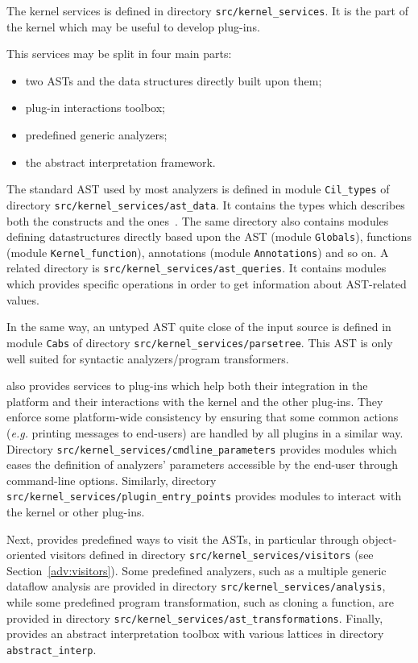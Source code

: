 The kernel services is defined in directory \texttt{src/kernel\_services}. It
is the part of the \framac kernel which may be useful to develop plug-ins.

This services may be split in four main parts:
\begin{itemize}
\item two ASTs and the data structures directly built upon them;
\item plug-in interactions toolbox;
\item predefined generic analyzers;
\item the abstract interpretation framework.
\end{itemize}

The standard AST used by most analyzers is defined in module
\texttt{Cil\_types} of directory
\texttt{src/kernel\_services/ast\_data}. It contains the types which describes
both the \C constructs and the \acsl ones~\cite{acsl}. The same directory also
contains modules defining datastructures directly based upon the AST (module
\texttt{Globals}), functions (module
\texttt{Kernel\_function}), annotations (module
\texttt{Annotations}) and so on. A related directory is
\texttt{src/kernel\_services/ast\_queries}. It contains modules which provides
specific operations in order to get information about AST-related values.

In the same way, an untyped AST quite close of the \C input source is defined in
module \texttt{Cabs} of directory
\texttt{src/kernel\_services/parsetree}. This AST is only well suited
for syntactic analyzers/program transformers.

\framac also provides services to plug-ins which help both their integration in
the platform and their interactions with the kernel and the other plug-ins. They
enforce some platform-wide consistency by ensuring that some common actions
(\emph{e.g.} printing messages to end-users) are handled by all plugins in a
similar way. Directory \texttt{src/kernel\_services/cmdline\_parameters}
provides modules which eases the definition of analyzers' parameters accessible
by the end-user through command-line options. Similarly, directory
\texttt{src/kernel\_services/plugin\_entry\_points} provides modules to interact
with the \framac kernel or other plug-ins.

Next, \framac provides predefined ways to visit the ASTs, in particular through
object-oriented visitors defined in directory
\texttt{src/kernel\_services/visitors} (see Section~\ref{adv:visitors}).
Some predefined analyzers, such as a multiple generic dataflow analysis
are provided in directory \texttt{src/kernel\_services/analysis}, while some
predefined program transformation, such as cloning a function, are provided in
directory \texttt{src/kernel\_services/ast\_transformations}.
Finally, \framac provides an abstract interpretation
toolbox
with various lattices in directory \texttt{abstract\_interp}.

